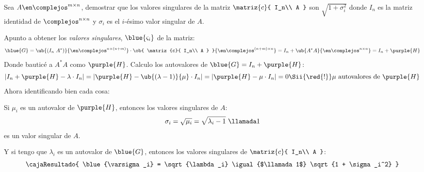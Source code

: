 \begin{enunciado}{\ejercicio}
  Sea $A \en \complejos^{m \times n}$, demostrar que los valores singulares de la matriz
  $\matriz{c}{
      I_n\\
      A
    }$
  son $\sqrt{1 + \sigma_i^2}$ donde $I_n$ es la matriz identidad de $\complejos^{n \times n}$ y $\sigma_i$ es
  el $i$-ésimo valor singular de $A$.
\end{enunciado}
Apunto a obtener los \textit{valores singulares}, $\blue{\varsigma_i}$ de la matriz:
$$
  \blue{G} =
  \ub{
    (I_n\ A^*)
  }{
    \en  \complejos^{n \times (n + m)}
  }
  \cdot
  \ob{
    \matriz{c}{
      I_n\\
      A
    }
  }{
    \en \complejos^{(n + m) \times n}
  }
  =
  I_n + \ub{A^* A}{\en \complejos^{n \times n}} = I_n  + \purple{H}
$$
Donde bauticé a $A^*A$ como $\purple{H}$.
Calculo los autovalores de $\blue{G} = I_n + \purple{H}$:
$$
  |I_n + \purple{H} - \lambda \cdot I_n| =
  |\purple{H} - \ub{(\lambda - 1)}{\mu}\cdot I_n| =
  |\purple{H} - \mu \cdot I_n|  = 0
  \Sii{\red{!}}
  \mu \text{ autovalores de } \purple{H}
$$
Ahora identificando bien cada cosa:

Si $\mu_i$ es un autovalor de $\purple{H}$, entonces los valores singulares de $A$:
$$
  \sigma_i = \sqrt{\mu_i} = \sqrt{\lambda_i - 1}\ \llamada1
$$
es un valor singular de $A$.

Y si tengo que $\lambda_i$ es un autovalor de $\blue{G}$, entonces los valores singulares de
$
  \matriz{c}{
    I_n\\
    A
  }
$:
$$
  \cajaResultado{
    \blue{\varsigma_i} = \sqrt{\lambda_i} \igual{$\llamada1$} \sqrt{1 + \sigma_i^2}
  }
$$

\begin{aportes}
  \item {}
\end{aportes}
